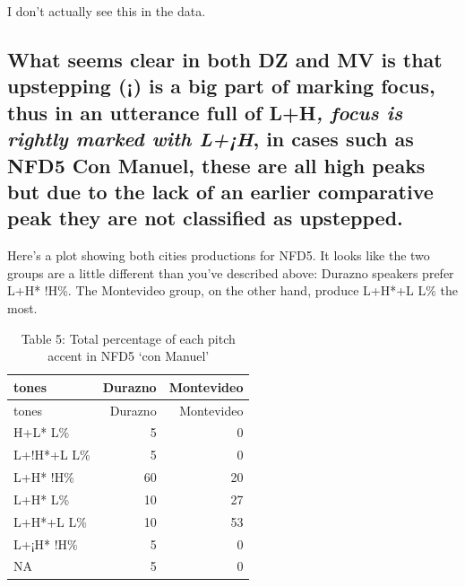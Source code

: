 \documentclass[
  man]{apa6}
\begin{document}
I don't actually see this in the data.

\hypertarget{what-seems-clear-in-both-dz-and-mv-is-that-upstepping-is-a-big-part-of-marking-focus-thus-in-an-utterance-full-of-lh-focus-is-rightly-marked-with-lh-in-cases-such-as-nfd5-con-manuel-these-are-all-high-peaks-but-due-to-the-lack-of-an-earlier-comparative-peak-they-are-not-classified-as-upstepped.}{%
\subsection{\texorpdfstring{What seems clear in both DZ and MV is that upstepping (¡) is a big part of marking focus, thus in an utterance full of L+H\emph{, focus is rightly marked with L+¡H}, in cases such as NFD5 Con Manuel, these are all high peaks but due to the lack of an earlier comparative peak they are not classified as upstepped.}{What seems clear in both DZ and MV is that upstepping (¡) is a big part of marking focus, thus in an utterance full of L+H, focus is rightly marked with L+¡H, in cases such as NFD5 Con Manuel, these are all high peaks but due to the lack of an earlier comparative peak they are not classified as upstepped.}}\label{what-seems-clear-in-both-dz-and-mv-is-that-upstepping-is-a-big-part-of-marking-focus-thus-in-an-utterance-full-of-lh-focus-is-rightly-marked-with-lh-in-cases-such-as-nfd5-con-manuel-these-are-all-high-peaks-but-due-to-the-lack-of-an-earlier-comparative-peak-they-are-not-classified-as-upstepped.}}

Here's a plot showing both cities productions for NFD5. It looks like the two groups are a little different than you've described above: Durazno speakers prefer L+H* !H\%. The Montevideo group, on the other hand, produce L+H*+L L\% the most.

\begin{longtable}[]{@{}lrr@{}}
\caption{\label{tab:unnamed-chunk-9}Table 5: Total percentage of each pitch accent in NFD5 `con Manuel'}\tabularnewline
\toprule\noalign{}
tones & Durazno & Montevideo \\
\midrule\noalign{}
\endfirsthead
\toprule\noalign{}
tones & Durazno & Montevideo \\
\midrule\noalign{}
\endhead
\bottomrule\noalign{}
\endlastfoot
H+L* L\% & 5 & 0 \\
L+!H*+L L\% & 5 & 0 \\
L+H* !H\% & 60 & 20 \\
L+H* L\% & 10 & 27 \\
L+H*+L L\% & 10 & 53 \\
L+¡H* !H\% & 5 & 0 \\
NA & 5 & 0 \\
\end{longtable}
\end{document}
